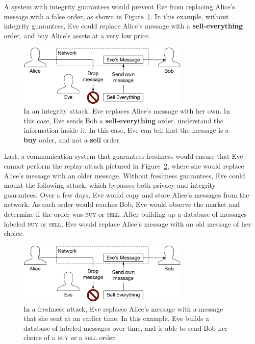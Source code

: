 A system with integrity guarantees would prevent Eve from replacing Alice's
message with a false order, as shown in Figure~\ref{fig:integrity_attack}. In
this example, without integrity guarantees, Eve could replace Alice's message
with a \textbf{sell-everything} order, and buy Alice's assets at a very low
price.

\begin{figure}[hbt]
  \centering
  \includegraphics[width=85mm]{figures/integrity_attack.pdf}
  \caption{
    In an integrity attack, Eve replaces Alice's message with her own. In this
    case, Eve sends Bob a \textbf{sell-everything} order.
    understand the information inside it. In this case, Eve can tell that the
    message is a \textbf{buy} order, and not a \textbf{sell} order.
  }
  \label{fig:integrity_attack}
\end{figure}

Last, a communication system that guarantees freshness would ensure that Eve
cannot perform the replay attack pictured in Figure~\ref{fig:freshness_attack},
where she would replace Alice's message with an older message. Without
freshness guarantees, Eve could mount the following attack, which bypasses
both privacy and integrity guarantees. Over a few days, Eve would copy and
store Alice's messages from the network. As each order would reaches Bob, Eve
would observe the market and determine if the order was \textsc{buy} or
\textsc{sell}. After building up a database of messages labeled \textsc{buy} or
\textsc{sell}, Eve would replace Alice's message with an old message of her
choice.

\begin{figure}[hbt]
  \centering
  \includegraphics[width=85mm]{figures/integrity_attack.pdf}
  \caption{
    In a freshness attack, Eve replaces Alice's message with a message that she
    sent at an earlier time. In this example, Eve builds a database of labeled
    messages over time, and is able to send Bob her choice of a \textsc{buy} or
    a \textsc{sell} order.
  }
  \label{fig:freshness_attack}
\end{figure}


